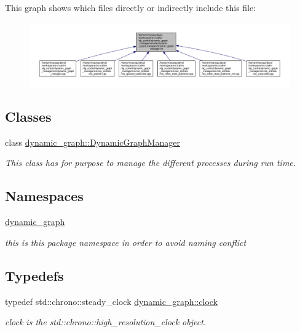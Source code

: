 This graph shows which files directly or indirectly include this file\+:\nopagebreak
\begin{figure}[H]
\begin{center}
\leavevmode
\includegraphics[width=350pt]{dynamic__graph__manager_8hh__dep__incl}
\end{center}
\end{figure}
\subsection*{Classes}
\begin{DoxyCompactItemize}
\item 
class \hyperlink{classdynamic__graph_1_1DynamicGraphManager}{dynamic\+\_\+graph\+::\+Dynamic\+Graph\+Manager}
\begin{DoxyCompactList}\small\item\em This class has for purpose to manage the different processes during run time. \end{DoxyCompactList}\end{DoxyCompactItemize}
\subsection*{Namespaces}
\begin{DoxyCompactItemize}
\item 
 \hyperlink{namespacedynamic__graph}{dynamic\+\_\+graph}
\begin{DoxyCompactList}\small\item\em this is this package namespace in order to avoid naming conflict \end{DoxyCompactList}\end{DoxyCompactItemize}
\subsection*{Typedefs}
\begin{DoxyCompactItemize}
\item 
typedef std\+::chrono\+::steady\+\_\+clock \hyperlink{namespacedynamic__graph_aca70acb5331a18e090e49b3d85290a7e}{dynamic\+\_\+graph\+::clock}
\begin{DoxyCompactList}\small\item\em clock is the std\+::chrono\+::high\+\_\+resolution\+\_\+clock object. \end{DoxyCompactList}\end{DoxyCompactItemize}


